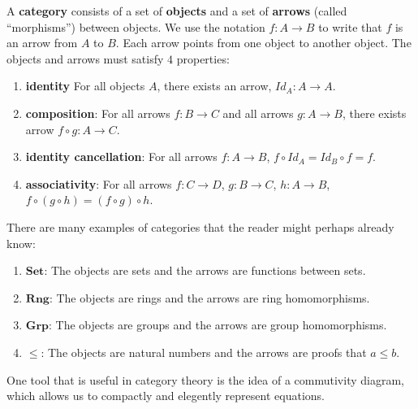 \documentclass[14pt]{extarticle}  %
\begin{document}
\begin{defn}
  A \textbf{category} consists of a set of \textbf{objects} and a set of \textbf{arrows} (called ``morphisms'') between objects. We use the notation $f : A \to B$ to write that $f$
  is an arrow from $A$ to $B$. Each arrow points from one
  object to another object. The objects and arrows must satisfy $4$ properties:
  \begin{enumerate}
    \item \textbf{identity} For all objects $A$, there exists an arrow, $Id_{A} : A \to A$.
    \item \textbf{composition}: For all arrows $f: B \to  C$ and all arrows $g : A \to B$, there exists arrow $f \circ g : A \to C$.
    \item \textbf{identity cancellation}: For all arrows $f : A \to B$, $f \circ Id_{A} = Id_{B} \circ f = f$.
    \item \textbf{associativity}: For all arrows $f : C \to D $, $g : B \to C$, $h : A \to B$, $f \circ (g \circ h) = (f \circ g) \circ h$.
\end{enumerate}
\end{defn}

\begin{ex}
  There are many examples of categories that the reader might perhaps already know:
  \begin{enumerate}
    \item $\textbf{Set}$: The objects are sets and the arrows are functions between sets.
    \item $\textbf{Rng}$: The objects are rings and the arrows are ring homomorphisms.
    \item $\textbf{Grp}$: The objects are groups and the arrows are group homomorphisms.
    \item $\le$: The objects are natural numbers and the arrows are proofs that $a \le b$.
    \end{enumerate}
\end{ex}


One tool that is useful in category theory is the idea of a commutivity diagram, which allows us to compactly and elegently represent equations.
\end{document}
